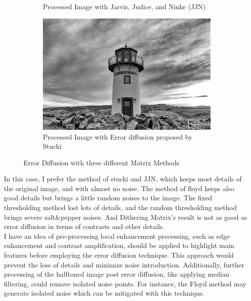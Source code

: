 \documentclass[12pt]{article}
\begin{document}
\begin{figure}[H]
\begin{subfigure}{0.4\textwidth}
		\caption{Processed Image with Jarvis, Judice, and Ninke (JJN)}
		\label{fig:Lighthouse_JIN}
	\end{subfigure}
	\hfill
	\begin{subfigure}{0.4\textwidth}
		\centering
		\includegraphics[width=\textwidth]{Lighthouse_Stucki.jpg}
		\caption{Processed Image with Error diffusion proposed by Stucki}
		\label{fig:Lighthouse_Stucki}
	\end{subfigure}
	\caption{Error Diffusion with three different Matrix Methods}
	\label{p2a3}
\end{figure}
In this case, I prefer the method of stucki and JJN, which keeps most details of the original image, and with almost no noise. The method of floyd keeps also good details but brings a little random noises to the image. The fixed thresholding method lost lots of details, and the random thresholding method brings severe salt\&pepper noises. And Dithering Matrix's result is not as good as error diffusion in terms of contrasts and other details. \\

I have an idea of pre-processing local enhancement processing, such as edge enhancement and contrast amplification, should be applied to highlight main features before employing the error diffusion technique. This approach would prevent the loss of details and minimize noise introduction. Additionally, further processing of the halftoned image post error diffusion, like applying median filtering, could remove isolated noise points. For instance, the Floyd method may generate isolated noise which can be mitigated with this technique.\\\\
\end{document}
